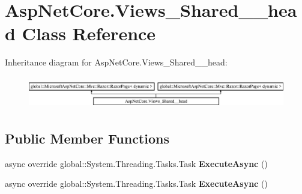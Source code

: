 \hypertarget{class_asp_net_core_1_1_views___shared____head}{}\section{Asp\+Net\+Core.\+Views\+\_\+\+Shared\+\_\+\+\_\+head Class Reference}
\label{class_asp_net_core_1_1_views___shared____head}
Inheritance diagram for Asp\+Net\+Core.\+Views\+\_\+\+Shared\+\_\+\+\_\+head\+:\begin{figure}[H]
\begin{center}
\leavevmode
\includegraphics[height=1.432225cm]{class_asp_net_core_1_1_views___shared____head}
\end{center}
\end{figure}
\subsection*{Public Member Functions}
\begin{DoxyCompactItemize}
\item 
\mbox{\label{class_asp_net_core_1_1_views___shared____head_ac0c2ce4fdd6fd41b3c2afb6516b64137}} 
async override global\+::\+System.\+Threading.\+Tasks.\+Task {\bfseries Execute\+Async} ()
\item 
\mbox{\label{class_asp_net_core_1_1_views___shared____head_ac0c2ce4fdd6fd41b3c2afb6516b64137}} 
async override global\+::\+System.\+Threading.\+Tasks.\+Task {\bfseries Execute\+Async} ()
\end{DoxyCompactItemize}
